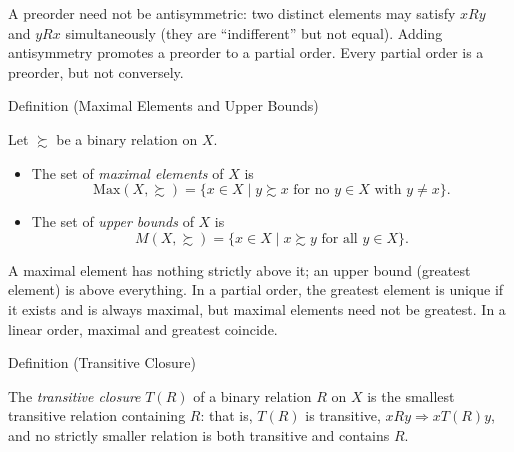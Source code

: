 \begin{remark*}
A preorder need not be antisymmetric: two distinct elements may satisfy
$xRy$ and $yRx$ simultaneously (they are ``indifferent'' but not equal).
Adding antisymmetry promotes a preorder to a partial order. Every partial
order is a preorder, but not conversely.
\end{remark*}

\begin{definitionbox}{Definition (Maximal Elements and Upper Bounds)}
\begin{definition}\label{def:maximal-upper}
Let $\succsim$ be a binary relation on $X$.
\begin{itemize}
  \item The set of \emph{maximal elements} of $X$ is
    \[
      \mathrm{Max}(X, \succsim)
      = \{ x \in X \mid y \succsim x \text{ for no } y \in X \text{ with }
          y \neq x \}.
    \]
  \item The set of \emph{upper bounds} of $X$ is
    \[
      M(X, \succsim)
      = \{ x \in X \mid x \succsim y \text{ for all } y \in X \}.
    \]
\end{itemize}
\end{definition}
\end{definitionbox}

\begin{remark*}
A maximal element has nothing strictly above it; an upper bound (greatest
element) is above everything. In a partial order, the greatest element is
unique if it exists and is always maximal, but maximal elements need not be
greatest. In a linear order, maximal and greatest coincide.
\end{remark*}

\begin{definitionbox}{Definition (Transitive Closure)}
\begin{definition}\label{def:trans-closure}
The \emph{transitive closure} $T(R)$ of a binary relation $R$ on $X$ is the
smallest transitive relation containing $R$: that is, $T(R)$ is transitive,
$xRy \Rightarrow xT(R)y$, and no strictly smaller relation is both transitive
and contains $R$.
\end{definition}
\end{definitionbox}

